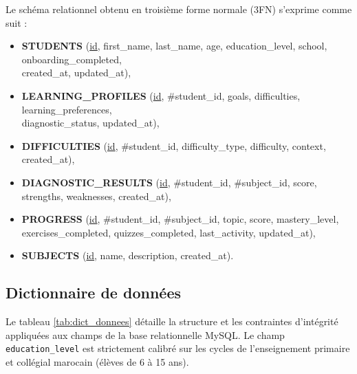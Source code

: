 \documentclass[12pt,a4paper]{report}
\begin{document}
Le schéma relationnel obtenu en troisième forme normale (3FN) s'exprime comme suit :
\begin{itemize}
  \item[—] \textbf{STUDENTS} (\underline{id}, first\_name, last\_name, age, education\_level, school, onboarding\_completed,\\
  \hspace*{0.5cm}created\_at, updated\_at),
  \item[—] \textbf{LEARNING\_PROFILES} (\underline{id}, \#student\_id, goals, difficulties, learning\_preferences,\\
  \hspace*{0.5cm}diagnostic\_status, updated\_at),
  \item[—] \textbf{DIFFICULTIES} (\underline{id}, \#student\_id, difficulty\_type, difficulty, context, created\_at),
  \item[—] \textbf{DIAGNOSTIC\_RESULTS} (\underline{id}, \#student\_id, \#subject\_id, score, strengths, weaknesses, created\_at),
  \item[—] \textbf{PROGRESS} (\underline{id}, \#student\_id, \#subject\_id, topic, score, mastery\_level,\\
  \hspace*{0.5cm}exercises\_completed, quizzes\_completed, last\_activity, updated\_at),
  \item[—] \textbf{SUBJECTS} (\underline{id}, name, description, created\_at).
\end{itemize}

\subsection{Dictionnaire de données}
Le tableau \ref{tab:dict_donnees} détaille la structure et les contraintes d'intégrité appliquées aux champs de la base relationnelle MySQL. Le champ \texttt{education\_level} est strictement calibré sur les cycles de l'enseignement primaire et collégial marocain (élèves de 6 à 15 ans).
\end{document}
